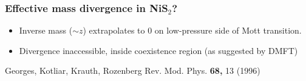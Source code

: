 \begin{frame}[label=QONiS2-2]
\frametitle{Effective mass divergence in NiS$_2$?}
\vspace{0.5em}

\centerline{}
\begin{itemize}
\item<1->
Inverse mass ($\sim z$) extrapolates to 0 on low-pressure side of Mott
transition.
\item<visible@2->
Divergence inaccessible, inside coexistence region (as suggested by DMFT)

\end{itemize}

\vspace*{\fill}
\vspace{-0.25em}
\centerline{\makebox[\linewidth]{\rule{0.85\textwidth}{0.4pt}}}
\centerline{\scriptsize Georges, Kotliar, Krauth, Rozenberg
  Rev. Mod. Phys. {\bf 68,} 13 (1996)}
\end{frame}








